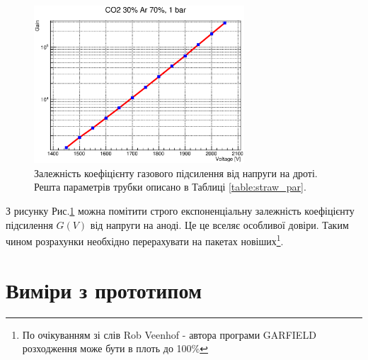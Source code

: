 \documentclass[pdftex,14pt]{scrartcl}
\begin{document}
\begin{spacing}{1.5}
	\begin{figure}[h!]
	\centering
	\includegraphics[width=0.7\textwidth]{gain_1450_2050V}
	\caption{Залежність коефіцієнту газового підсилення від напруги на дроті. Решта параметрів трубки описано в Таблиці \ref{table:straw_par}.}
	\label{fig:gainVoltage}	
	\end{figure} 

	З рисунку Рис.\ref{fig:gainVoltage} можна помітити строго експоненціальну залежність коефіцієнту підсилення $G(V)$ від напруги на аноді. Це це вселяє особливої довіри. Таким чином розрахунки необхідно перерахувати на пакетах новіших\footnote{По очікуванням зі слів Rob Veenhof - автора програми GARFIELD \cite{garfield} розходження може бути в плоть до 100\%}.
	
	
	
	
	
%		
	

	\section{Виміри з прототипом}
	\label{sec:Mesurements}	
	
	
	

\end{spacing}
\end{document}
